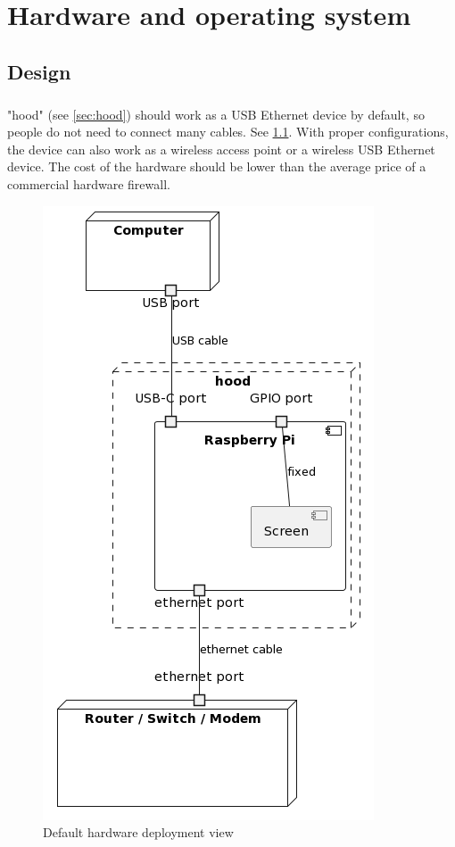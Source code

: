 \documentclass[mscthesis]{usiinfthesis}
\begin{document}
\chapter{Hardware and operating system}\label{cha:hard}
\section{Design}
\paragraph{}
"hood" (see \cref{sec:hood}) should work as a USB Ethernet device by default, so people do not need to connect many cables. See \cref{fig:hardware-deployment-view}. With proper configurations, the device can also work as a wireless access point or a wireless USB Ethernet device. The cost of the hardware should be lower than the average price of a commercial hardware firewall.
\begin{figure}[H]
  \centering
  \includegraphics[scale=0.5]{graphics/puml/hardware-deployment-view.png}
  \caption{Default hardware deployment view}
  \label{fig:hardware-deployment-view}
\end{figure}
\end{document}
